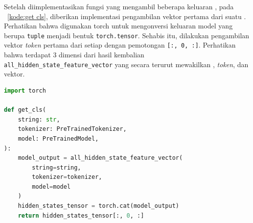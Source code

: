 Setelah diimplementasikan fungsi yang mengambil beberapa keluaran , pada \kode{}~\ref{kode:get cls}, diberikan implementasi pengambilan vektor pertama dari suatu \hs{}. Perhatikan bahwa digunakan \library{} torch untuk mengonversi keluaran model yang berupa \lstinline{tuple} menjadi bentuk \lstinline{torch.tensor}. Sehabis itu, dilakukan pengambilan vektor \textit{token} pertama dari setiap  dengan pemotongan \lstinline{[:, 0, :]}. Perhatikan bahwa terdapat 3 dimensi dari hasil kembalian \lstinline{all_hidden_state_feature_vector} yang secara terurut mewakilkan \hs{}, \textit{token}, dan vektor.
\begin{lstlisting}[language=Python, caption={Pengambilan vektor pertama keluaran \hs{}}, label={kode:get cls}]
import torch

def get_cls(
    string: str,
    tokenizer: PreTrainedTokenizer,
    model: PreTrainedModel,
):
    model_output = all_hidden_state_feature_vector(
        string=string,
        tokenizer=tokenizer,
        model=model
    )
    hidden_states_tensor = torch.cat(model_output)
    return hidden_states_tensor[:, 0, :]
\end{lstlisting}





